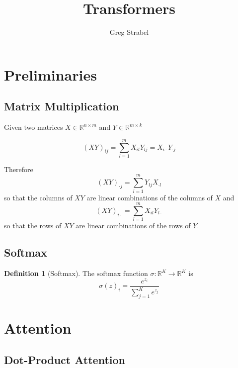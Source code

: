 \documentclass[11pt]{article}
\author{Greg Strabel}
\title{Transformers}
\theoremstyle{definition}
\newtheorem{definition}{Definition}[section]
\begin{document}
\maketitle

\section{Preliminaries}

\subsection{Matrix Multiplication}
Given two matrices $X \in \mathbb{R}^{n \times m}$ and $Y \in \mathbb{R}^{m \times k}$

\begin{equation}
\left( XY \right)_{ij} = \sum_{l=1}^m X_{il}Y_{lj} = X_{i \cdot} Y_{\cdot j}
\end{equation}

Therefore
\begin{equation}
\left( XY \right)_{\cdot j} = \sum_{l=1}^m Y_{lj} X_{\cdot l}
\end{equation}
so that the columns of $XY$ are linear combinations of the columns of $X$ and
\begin{equation}
\left( XY \right)_{i \cdot} = \sum_{l=1}^m X_{il} Y_{l \cdot}
\end{equation}
so that the rows of $XY$ are linear combinations of the rows of $Y$.

\subsection{Softmax}

\begin{definition}[Softmax] The $\mathrm{softmax}$ function $\sigma : \mathbb{R}^K \rightarrow \mathbb{R}^K$ is
\begin{equation}
\sigma(z)_i = \frac{e^{z_i}}{\sum_{j=1}^K e^{z_j}}
\end{equation}
\end{definition}

\section{Attention}


\subsection{Dot-Product Attention}
\end{document}
